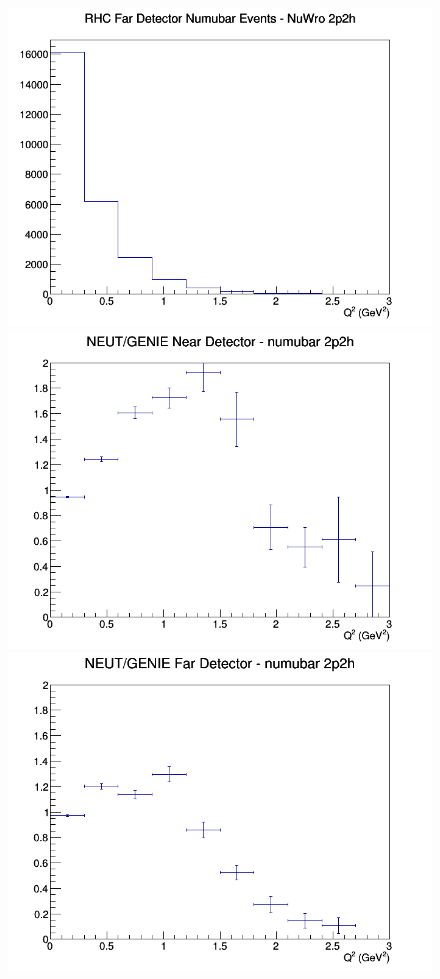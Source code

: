\documentclass[12pt]{article}
\begin{document}
\begin{figure}[h]
\endminipage
{}
\includegraphics[width=\linewidth]{eff_Q2/LAr/2p2h_RHC_FD_numubar_Q2_NuWro.png}
\endminipage
\newline
{}
\includegraphics[width=\linewidth]{eff_Q2/LAr/ratios/2p2h_NEUT_GENIE_numubar_near_Q2.png}
\endminipage
{}
\includegraphics[width=\linewidth]{eff_Q2/LAr/ratios/2p2h_NEUT_GENIE_numubar_far_Q2.png}

\end{figure}
\end{document}
